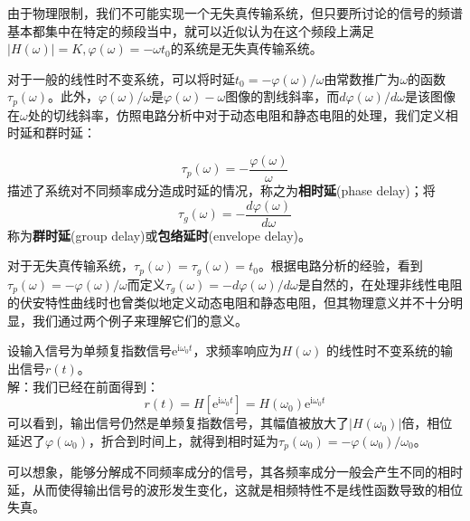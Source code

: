 \documentclass{ctexbook}
\begin{document}
由于物理限制，我们不可能实现一个无失真传输系统，但只要所讨论的信号的频谱基本都集中在特定的频段当中，就可以近似认为在这个频段上满足$|H(\omega)|=K,\varphi(\omega)=-\omega t_0$的系统是无失真传输系统。

对于一般的线性时不变系统，可以将时延$t_0=-\varphi(\omega)/\omega$由常数推广为$\omega$的函数$\tau_p(\omega)$。此外，$\varphi(\omega)/\omega$是$\varphi(\omega)-\omega$图像的割线斜率，而$d\varphi(\omega)/d\omega$是该图像在$\omega$处的切线斜率，仿照电路分析中对于动态电阻和静态电阻的处理，我们定义相时延和群时延\cite{signal_systems}：
\begin{definition}[相时延和群时延]
\[\tau_p(\omega)=-\frac{\varphi(\omega)}{\omega}\]
描述了系统对不同频率成分造成时延的情况，称之为\textbf{相时延}(phase delay)；将
\[\tau_g(\omega)=-\frac{d\varphi(\omega)}{d\omega}\]
称为\textbf{群时延}(group delay)或\textbf{包络延时}(envelope delay)。
\end{definition}

对于无失真传输系统，$\tau_p(\omega)=\tau_g(\omega)=t_0$。根据电路分析的经验，看到$\tau_p(\omega)=-\varphi(\omega)/\omega$而定义$\tau_g(\omega)=-d\varphi(\omega)/d\omega$是自然的，在处理非线性电阻的伏安特性曲线时也曾类似地定义动态电阻和静态电阻，但其物理意义并不十分明显，我们通过两个例子来理解它们的意义。

\begin{example}[相时延]
设输入信号为单频复指数信号$\mathrm{e}^{\mathrm{i}\omega_0 t}$，求频率响应为$H(\omega)$
的线性时不变系统的输出信号$r(t)$。\\
解：我们已经在前面得到：\[r(t)=H\left[\mathrm{e}^{\mathrm{i}\omega_0 t}\right]=H(\omega_0)\mathrm{e}^{\mathrm{i}\omega_0 t}\]
可以看到，输出信号仍然是单频复指数信号，其幅值被放大了$|H(\omega_0)|$倍，相位
延迟了$\varphi(\omega_0)$，折合到时间上，就得到相时延为$\tau_p(\omega_0)=-\varphi(\omega_0)/\omega_0$。
\end{example}

可以想象，能够分解成不同频率成分的信号，其各频率成分一般会产生不同的相时延，从而使得输出信号的波形发生变化，这就是相频特性不是线性函数导致的相位失真。
\end{document}

